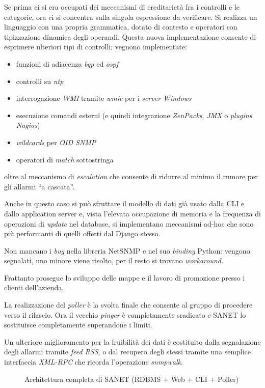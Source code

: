 \documentclass[a4wide,10pt,italian]{manual}
\begin{document}
Se prima ci si era occupati dei meccanismi di ereditarietà fra i controlli e le categorie, ora ci si concentra sulla singola espressione da verificare. Si realizza un linguaggio con una propria grammatica, dotato di contesto e operatori con tipizzazione dinamica degli operandi. Questa nuova implementazione consente di esprimere ulteriori tipi di controlli; vegnono implementate:
\begin{itemize}
\item {} 
funzioni di adiacenza \emph{bgp} ed \emph{ospf}

\item {} 
controlli su \emph{ntp}

\item {} 
interrogazione \emph{WMI} tramite \emph{wmic} per i \emph{server Windows}

\item {} 
esecuzione comandi esterni (e quindi integrazione \emph{ZenPacks}, \emph{JMX} o \emph{plugins Nagios})

\item {} 
\emph{wildcards} per \emph{OID SNMP}

\item {} 
operatori di \emph{match} sottostringa

\end{itemize}

oltre al meccanismo di \emph{escalation} che consente di ridurre al minimo il rumore per gli allarmi ``a cascata''.

Anche in questo caso si può sfruttare il modello di dati già usato dalla CLI e dallo application server
e, vista l'elevata occupazione di memoria e la frequenza di operazioni di \emph{update} nel database,
si implementano meccanismi ad-hoc che sono più performanti di quelli offerti dal Django stesso.

Non mancano i \emph{bug} nella libreria NetSNMP e nel suo \emph{binding} Python: vengono segnalati, uno minore viene risolto,
per il resto si trovano \emph{workaround}.

Frattanto prosegue lo sviluppo delle mappe e il lavoro di promozione presso i clienti dell'azienda.

La realizzazione del \emph{poller} è la svolta finale che consente al gruppo di procedere verso il rilascio.
Ora il vecchio \emph{pinger} è completamente sradicato e SANET lo sostituisce completamente superandone i limiti.

Un ulteriore miglioramento per la fruibilità dei dati è costituito dalla segnalazione degli allarmi tramite \emph{feed RSS},
o dal recupero degli stessi tramite una semplice interfaccia \emph{XML-RPC} che ricorda l'operazione \emph{snmpwalk}.
\hypertarget{dev-architecture}{}\begin{figure}[htbp]
\centering

\caption{Architettura completa di SANET (RDBMS + Web + CLI + Poller)}\end{figure}
\end{document}
